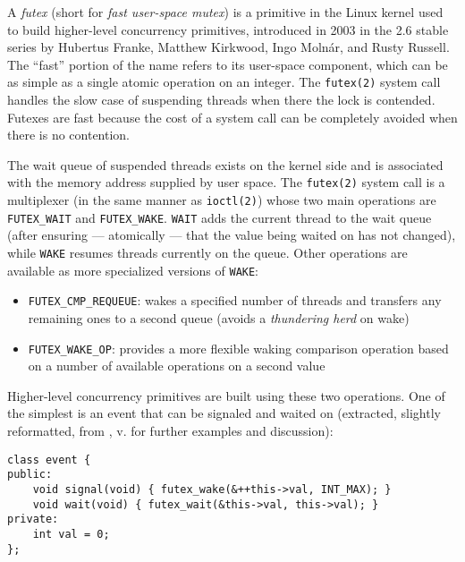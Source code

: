 A \textit{futex} (short for \textit{fast user-space mutex}) is a primitive in
the Linux kernel used to build higher-level concurrency primitives, introduced
in 2003 in the 2.6 stable series by Hubertus Franke, Matthew Kirkwood, Ingo
Molnár, and Rusty Russell.  The ``fast'' portion of the name refers to its
user-space component, which can be as simple as a single atomic operation on an
integer.  The \texttt{futex(2)} system call handles the slow case of suspending
threads when there the lock is contended.  Futexes are fast because the cost of
a system call can be completely avoided when there is no
contention.\footnotemark


The wait queue of suspended threads exists on the kernel side and is associated
with the memory address supplied by user space.  The \texttt{futex(2)} system
call is a multiplexer (in the same manner as \texttt{ioctl(2)}) whose two main
operations are \texttt{FUTEX\_WAIT} and \texttt{FUTEX\_WAKE}.  \texttt{WAIT}
adds the current thread to the wait queue (after ensuring --- atomically ---
that the value being waited on has not changed), while \texttt{WAKE} resumes
threads currently on the queue.  Other operations are available as more
specialized versions of \texttt{WAKE}:

\begin{itemize}
    \item \texttt{FUTEX\_CMP\_REQUEUE}:
        wakes a specified number of threads and transfers any remaining ones to
        a second queue (avoids a \textit{thundering herd} on wake)
    \item \texttt{FUTEX\_WAKE\_OP}:
        provides a more flexible waking comparison operation based on a number
        of available operations on a second value
\end{itemize}

Higher-level concurrency primitives are built using these two operations.  One
of the simplest is an event that can be signaled and waited on (extracted,
slightly reformatted, from \cite{Drepper2011}, v. for further examples and
discussion):

\begin{lstlisting}[style=c++]
class event {
public:
    void signal(void) { futex_wake(&++this->val, INT_MAX); }
    void wait(void) { futex_wait(&this->val, this->val); }
private:
    int val = 0;
};
\end{lstlisting}

